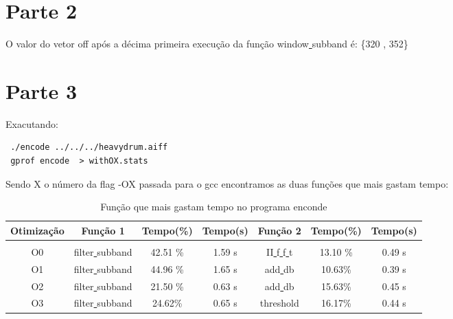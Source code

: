 \documentclass[10pt,a4paper]{article}
\begin{document}








\section{Parte 2}
O valor do vetor off após a décima primeira execução da função
window\underline{ }subband é: \{320 , 352\} 

\section{Parte 3}
Exacutando:
\begin{verbatim}
 ./encode ../../../heavydrum.aiff 
 gprof encode  > withOX.stats
\end{verbatim}
Sendo X o número da flag -OX passada para o gcc encontramos as duas
funções que mais gastam tempo:

\begin{table}[h!]
  \caption{Função que mais gastam tempo no programa enconde}
  \begin{tabular}{ccccccc}
    Otimização & Função 1 & Tempo(\%) & Tempo(s) & Função 2  & Tempo(\%) &
    Tempo(s)\\
    \hline\\
    O0 & filter\underline{ }subband &42.51 \% &1.59 s &
    II\underline{ }f\underline{ }f\underline{ }t& 13.10 \%& 0.49 s\\
    O1 & filter\underline{ }subband & 44.96 \%& 1.65 s &
    add\underline{ }db& 10.63\%& 0.39 s\\
    O2 &
    filter\underline{ }subband& 21.50 \%& 0.63 s &
    add\underline{ }db &15.63\% &0.45 s\\
    O3 &
    filter\underline{ }subband &24.62\%& 0.65 s&
    threshold & 16.17\%& 0.44 s


  \end{tabular}
\end{table}
\end{document}
